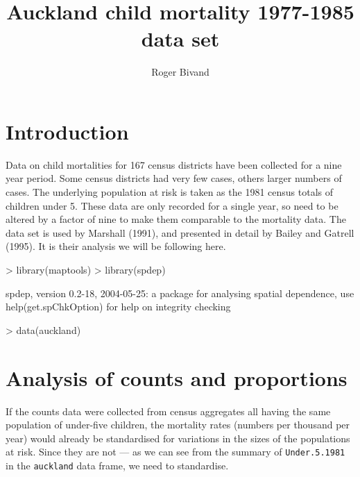 \documentclass[a4paper,10pt]{article}
\title{Auckland child mortality 1977-1985 data set}
\author{Roger Bivand}
\newcommand{\code}[1]{\texttt{\small #1}}
\begin{document}
 

\maketitle 




\section{Introduction}

Data on child mortalities for 167 census districts have been collected for a nine year period. Some census districts had very few cases, others larger numbers of cases. The underlying population at risk is taken as the 1981 census totals of children under 5. These data are only recorded for a single year, so need to be altered by a factor of nine to make them comparable to the mortality data. The data set is used by Marshall (1991), and presented in detail by Bailey and Gatrell (1995). It is their analysis we will be following here.

\begin{footnotesize}
\begin{Schunk}
\begin{Sinput}
> library(maptools)
> library(spdep)
\end{Sinput}
\begin{Soutput}
spdep, version 0.2-18, 2004-05-25:
 a package for analysing spatial dependence,
 use help(get.spChkOption) for help on integrity checking
\end{Soutput}
\begin{Sinput}
> data(auckland)
\end{Sinput}
\end{Schunk}
\end{footnotesize}

\section{Analysis of counts and proportions}

If the counts data were collected from census aggregates all having the same population of under-five children, the mortality rates (numbers per thousand per year) would already be standardised for variations in the sizes of the populations at risk. Since they are not --- as we can see from the summary of \code{Under.5.1981} in the \code{auckland} data frame, we need to standardise.
\end{document}
